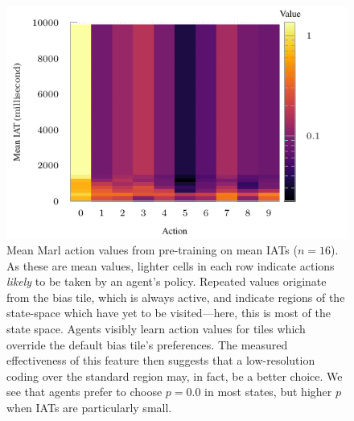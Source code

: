 \documentclass[conference, a4paper, 10pt, times]{IEEEtran}
\begin{document}
\begin{figure}
	\centering
	\includegraphics[width=0.9\linewidth]{../plots/policy-16-tcp-f5-mean-log}
	
	\caption{
		Mean Marl action values from pre-training on mean IATs ($n=16$).
		As these are mean values, lighter cells in each row indicate actions \emph{likely} to be taken by an agent's policy.
		Repeated values originate from the bias tile, which is always active, and indicate regions of the state-space which have yet to be visited---here, this is most of the state space.
		Agents visibly learn action values for tiles which override the default bias tile's preferences.
		The measured effectiveness of this feature then suggests that a low-resolution coding over the standard region may, in fact, be a better choice.
		We see that agents prefer to choose $p=0.0$ in most states, but higher $p$ when IATs are particularly small.
		\label{fig:intern-16-tcp-iat}
	}
\end{figure}
\end{document}
